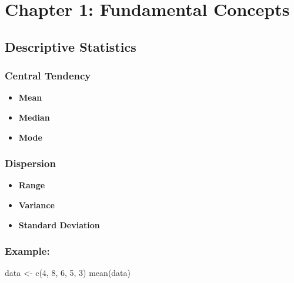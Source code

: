 \documentclass[
  letterpaper,
  DIV=11,
  numbers=noendperiod]{scrreprt}
\newenvironment{Shaded}{\begin{snugshade}}{\end{snugshade}}
\newcommand{\DecValTok}[1]{\textcolor[rgb]{0.68,0.00,0.00}{#1}}
\newcommand{\FunctionTok}[1]{\textcolor[rgb]{0.28,0.35,0.67}{#1}}
\newcommand{\NormalTok}[1]{\textcolor[rgb]{0.00,0.23,0.31}{#1}}
\newcommand{\OtherTok}[1]{\textcolor[rgb]{0.00,0.23,0.31}{#1}}
\providecommand{\tightlist}{%
  \setlength{\itemsep}{0pt}\setlength{\parskip}{0pt}}
\begin{document}
\section{Chapter 1: Fundamental
Concepts}\label{chapter-1-fundamental-concepts}

\subsection{Descriptive Statistics}\label{descriptive-statistics-2}

\subsubsection{Central Tendency}\label{central-tendency}

\begin{itemize}
\tightlist
\item
  \textbf{Mean}\\
\item
  \textbf{Median}\\
\item
  \textbf{Mode}
\end{itemize}

\subsubsection{Dispersion}\label{dispersion}

\begin{itemize}
\tightlist
\item
  \textbf{Range}\\
\item
  \textbf{Variance}\\
\item
  \textbf{Standard Deviation}
\end{itemize}

\subsubsection{Example:}\label{example-9}

\begin{Shaded}
\begin{Highlighting}[]
\NormalTok{data }\OtherTok{\textless{}{-}} \FunctionTok{c}\NormalTok{(}\DecValTok{4}\NormalTok{, }\DecValTok{8}\NormalTok{, }\DecValTok{6}\NormalTok{, }\DecValTok{5}\NormalTok{, }\DecValTok{3}\NormalTok{)}
\FunctionTok{mean}\NormalTok{(data)}
\end{Highlighting}
\end{Shaded}
\end{document}
